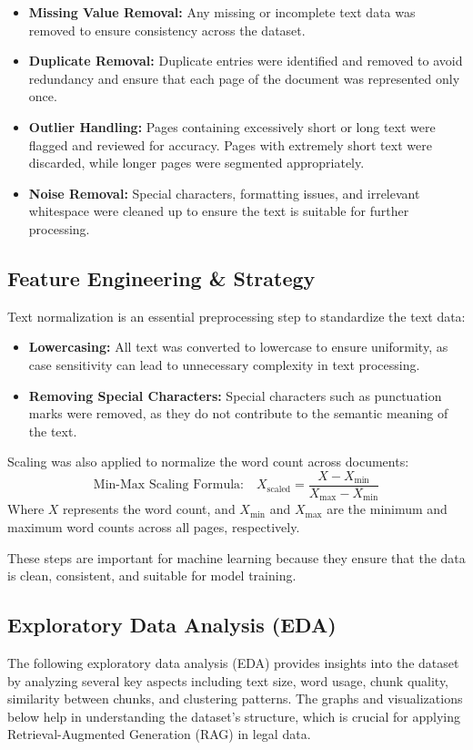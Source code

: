 \documentclass{article}
\begin{document}
\begin{itemize}
    \item \textbf{Missing Value Removal:} Any missing or incomplete text data was removed to ensure consistency across the dataset.
    \item \textbf{Duplicate Removal:} Duplicate entries were identified and removed to avoid redundancy and ensure that each page of the document was represented only once.
    \item \textbf{Outlier Handling:} Pages containing excessively short or long text were flagged and reviewed for accuracy. Pages with extremely short text were discarded, while longer pages were segmented appropriately.
    \item \textbf{Noise Removal:} Special characters, formatting issues, and irrelevant whitespace were cleaned up to ensure the text is suitable for further processing.
\end{itemize}

\subsection{Feature Engineering \& Strategy}
Text normalization is an essential preprocessing step to standardize the text data:
\begin{itemize}
    \item \textbf{Lowercasing:} All text was converted to lowercase to ensure uniformity, as case sensitivity can lead to unnecessary complexity in text processing.
    \item \textbf{Removing Special Characters:} Special characters such as punctuation marks were removed, as they do not contribute to the semantic meaning of the text.
\end{itemize}

Scaling was also applied to normalize the word count across documents:
\[
\text{Min-Max Scaling Formula:} \quad X_{\text{scaled}} = \frac{X - X_{\text{min}}}{X_{\text{max}} - X_{\text{min}}}
\]
Where \(X\) represents the word count, and \(X_{\text{min}}\) and \(X_{\text{max}}\) are the minimum and maximum word counts across all pages, respectively.

These steps are important for machine learning because they ensure that the data is clean, consistent, and suitable for model training.

\subsection{Exploratory Data Analysis (EDA)}
The following exploratory data analysis (EDA) provides insights into the dataset by analyzing several key aspects including text size, word usage, chunk quality, similarity between chunks, and clustering patterns. The graphs and visualizations below help in understanding the dataset's structure, which is crucial for applying Retrieval-Augmented Generation (RAG) in legal data.
\end{document}
